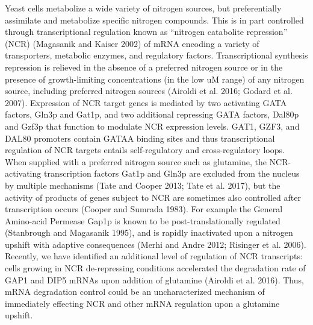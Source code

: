  Yeast cells
metabolize a wide variety of nitrogen sources, but preferentially
assimilate and metabolize specific nitrogen compounds. This is in part
controlled through transcriptional regulation known as “nitrogen
catabolite repression” (NCR)  (Magasanik and Kaiser 2002) of  mRNA
encoding a variety of transporters, metabolic enzymes, and regulatory
factors. Transcriptional synthesis repression is relieved in the
absence of a preferred nitrogen source or in the presence of
growth-limiting concentrations (in the low uM range) of any nitrogen
source, including preferred nitrogen sources (Airoldi et al. 2016;
Godard et al. 2007).  Expression of NCR target genes is mediated by
two activating GATA factors, Gln3p and Gat1p, and two additional
repressing GATA factors, Dal80p and Gzf3p that function to modulate
NCR expression levels. GAT1, GZF3, and DAL80 promoters contain GATAA
binding sites and thus transcriptional regulation of NCR targets
entails self-regulatory and cross-regulatory loops. When supplied with
a preferred nitrogen source such as glutamine, the NCR-activating
transcription factors Gat1p and Gln3p are excluded from the nucleus by
multiple mechanisms (Tate and Cooper 2013; Tate et al. 2017), but the
activity of products of genes subject to NCR are sometimes also
controlled after transcription occurs (Cooper and Sumrada 1983). For
example the General Amino-acid Permease Gap1p is known to be
post-translationally regulated (Stanbrough and Magasanik 1995), and is
rapidly inactivated upon a nitrogen upshift with adaptive consequences
(Merhi and Andre 2012; Risinger et al. 2006). Recently, we have
identified an additional level of regulation of NCR transcripts: cells
growing in NCR de-repressing conditions accelerated the degradation
rate of GAP1 and DIP5 mRNAs upon addition of glutamine (Airoldi et al.
2016). Thus, mRNA degradation control could be an uncharacterized
mechanism of immediately effecting NCR and other mRNA regulation upon
a glutamine upshift.  


